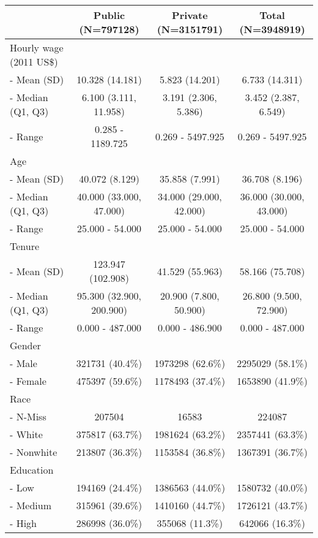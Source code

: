 \documentclass[]{article}
\title{}
\author{}
\date{}
\begin{document}
\begin{longtable}[c]{@{}lccc@{}}
\toprule
& Public (N=797128) & Private (N=3151791) & Total
(N=3948919)\tabularnewline
\midrule
\endhead
Hourly wage (2011 US\$) & & &\tabularnewline
- Mean (SD) & 10.328 (14.181) & 5.823 (14.201) & 6.733
(14.311)\tabularnewline
- Median (Q1, Q3) & 6.100 (3.111, 11.958) & 3.191 (2.306, 5.386) & 3.452
(2.387, 6.549)\tabularnewline
- Range & 0.285 - 1189.725 & 0.269 - 5497.925 & 0.269 -
5497.925\tabularnewline
Age & & &\tabularnewline
- Mean (SD) & 40.072 (8.129) & 35.858 (7.991) & 36.708
(8.196)\tabularnewline
- Median (Q1, Q3) & 40.000 (33.000, 47.000) & 34.000 (29.000, 42.000) &
36.000 (30.000, 43.000)\tabularnewline
- Range & 25.000 - 54.000 & 25.000 - 54.000 & 25.000 -
54.000\tabularnewline
Tenure & & &\tabularnewline
- Mean (SD) & 123.947 (102.908) & 41.529 (55.963) & 58.166
(75.708)\tabularnewline
- Median (Q1, Q3) & 95.300 (32.900, 200.900) & 20.900 (7.800, 50.900) &
26.800 (9.500, 72.900)\tabularnewline
- Range & 0.000 - 487.000 & 0.000 - 486.900 & 0.000 -
487.000\tabularnewline
Gender & & &\tabularnewline
- Male & 321731 (40.4\%) & 1973298 (62.6\%) & 2295029
(58.1\%)\tabularnewline
- Female & 475397 (59.6\%) & 1178493 (37.4\%) & 1653890
(41.9\%)\tabularnewline
Race & & &\tabularnewline
- N-Miss & 207504 & 16583 & 224087\tabularnewline
- White & 375817 (63.7\%) & 1981624 (63.2\%) & 2357441
(63.3\%)\tabularnewline
- Nonwhite & 213807 (36.3\%) & 1153584 (36.8\%) & 1367391
(36.7\%)\tabularnewline
Education & & &\tabularnewline
- Low & 194169 (24.4\%) & 1386563 (44.0\%) & 1580732
(40.0\%)\tabularnewline
- Medium & 315961 (39.6\%) & 1410160 (44.7\%) & 1726121
(43.7\%)\tabularnewline
- High & 286998 (36.0\%) & 355068 (11.3\%) & 642066
(16.3\%)\tabularnewline
\bottomrule
\end{longtable}
\end{document}
